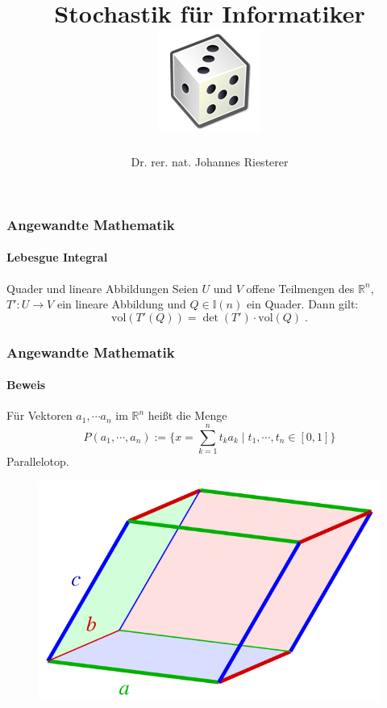 \documentclass{beamer}
\begin{document}
\title[Stochastik] %
{Stochastik für Informatiker
\\
\includegraphics[scale=0.5]{img/craps}
}
\subtitle{}
\author[Dr. Johannes Riesterer] %
{Dr.  rer. nat. Johannes Riesterer}

\date[KPT 2004] %
{}

\subject{Stochastik}





\begin{frame}
    \frametitle{Angewandte Mathematik}
\framesubtitle{Lebesgue Integral}
\begin{block}{Quader und lineare Abbildungen}
Seien $U$ und $V$ offene Teilmengen des $\mathbb{R}^n$, $T': U \to V$ ein lineare Abbildung und  $Q \in \mathbb{I}(n)$ ein Quader.
Dann gilt:
 $$ \text{vol}  (T'(Q))   =  \det (T') \cdot   \text{vol}(Q) \; .$$
\end{block}
 \end{frame}

\begin{frame}
    \frametitle{Angewandte Mathematik}
\framesubtitle{Beweis}
Für Vektoren $a_1, \cdots a_n$ im $\mathbb{R}^n$ heißt die Menge 
$$ P(a_1, \cdots,  a_n) := \biggl \{  x = \sum_{k=1}^n t_k a_k  \; | \; t_1, \cdots , t_n \in [0,1]  \biggr \}$$
Parallelotop.
\begin{figure}[H]
      \centering
    \includegraphics[width=0.6 \textwidth]{img/640px-Parallelepiped-0}    
\end{figure}
 \end{frame}
\end{document}
